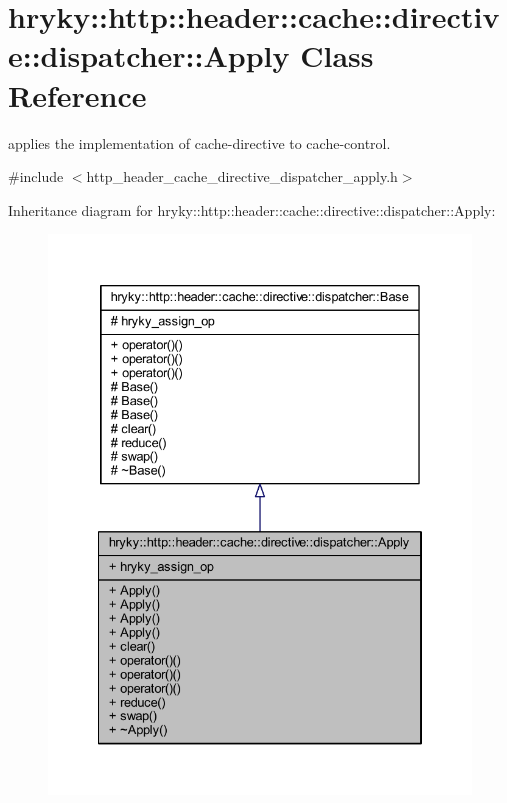 \hypertarget{classhryky_1_1http_1_1header_1_1cache_1_1directive_1_1dispatcher_1_1_apply}{\section{hryky\-:\-:http\-:\-:header\-:\-:cache\-:\-:directive\-:\-:dispatcher\-:\-:Apply Class Reference}
\label{classhryky_1_1http_1_1header_1_1cache_1_1directive_1_1dispatcher_1_1_apply}
}


applies the implementation of cache-\/directive to cache-\/control.  




{\ttfamily \#include $<$http\-\_\-header\-\_\-cache\-\_\-directive\-\_\-dispatcher\-\_\-apply.\-h$>$}



Inheritance diagram for hryky\-:\-:http\-:\-:header\-:\-:cache\-:\-:directive\-:\-:dispatcher\-:\-:Apply\-:
\nopagebreak
\begin{figure}[H]
\begin{center}
\leavevmode
\includegraphics[width=334pt]{classhryky_1_1http_1_1header_1_1cache_1_1directive_1_1dispatcher_1_1_apply__inherit__graph}
\end{center}
\end{figure}
